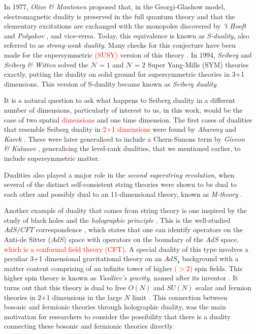 In 1977, \textit{Olive \& Montonen} \cite{Montonen:1977sn} proposed that, in the Georgi-Glashow model, electromagnetic duality is preserved in the full quantum theory and that the elementary excitations are exchanged with the monopoles discovered by \textit{'t Hooft} and \textit{Polyakov} \cite{Polyakov:1974ek, tHooft:1974kcl}, and vice-versa. Today, this equivalence is known as \textit{S-duality}, also referred to as \textit{strong-weak duality}. Many checks for this conjecture have been made for the supersymmetric \textcolor{red}{(SUSY)} version of this theory \cite{Osborn:1979tq, Witten:1978mh, Sen:1994yi, Vafa:1994tf}. In 1994, \textit{Seiberg} \cite{Seiberg:1994bz, Seiberg:1994pq} and \textit{Seiberg \& Witten} \cite{Seiberg:1994rs} solved the $\mathcal{N}=1$ and $\mathcal{N}=2$ Super Yang-Mills (SYM) theories exactly, putting the duality on solid ground for supersymmetric theories in 3+1 dimensions. This version of S-duality became known as \textit{Seiberg duality}.

It is a natural question to ask what happens to Seiberg duality in a different number of dimensions, particularly of interest to us, in this work, would be the case of two spatial \textcolor{red}{dimensions} and one time dimension. The first cases of dualities that resemble Seiberg duality in \textcolor{red}{2+1 dimensions} were found by \textit{Aharony} and \textit{Karch} \cite{Aharony:1997gp, Karch:1997ux}. These were later generali\textcolor{red}{s}ed to include a Chern-Simons term by \textit{Giveon \& Kutasov} \cite{Giveon:2008zn}, generali\textcolor{red}{s}ing the level-rank dualities, that we mentioned earlier, to include supersymmetric matter.

Dualities also played a major role in the \textit{second superstring revolution}, when several of the distinct self-consistent string theories were shown to be dual to each other \cite{Sen:1994fa, Schwarz:1994xn, Sathiapalan:1986zb, Hull:1994ys} and possibly dual to an 11-dimensional theory, known as \textit{M-theory} \cite{Witten:1995ex}.

Another example of duality that comes from string theory is one inspired by the study of black holes and the \textit{holographic principle} \cite{Susskind:1994vu, tHooft:1993dmi}. This is the well-studied $AdS/CFT$ correspondence \cite{Aharony:1999ti, Maldacena:1997re}, which states that one can identify operators on the Anti-de Sitter ($AdS$) space with operators on the boundary of the $AdS$ space\textcolor{red}{, which is a conformal field theory (CFT)}. A special duality of this type involves a peculiar 3+1 dimensional gravitational theory on an $AdS_4$ background with a matter content comprising of an infinite tower of higher \textcolor{red}{($>2$)} spin  fields. This higher spin theory is known as \textit{Vasiliev's gravity}, named after its inventor \cite{Vasiliev:1992av}. It turns out that this theory is dual to free $O(N)$ and $SU(N)$ scalar and fermion theories in 2+1 dimensions in the large $N$ limit \cite{Sezgin:2003pt, Klebanov:2002ja}. This connection between bosonic and fermionic theories through holographic duality, was the main motivation for researchers to consider the possibility that there is a duality connecting these bosonic and fermionic theories directly. 

